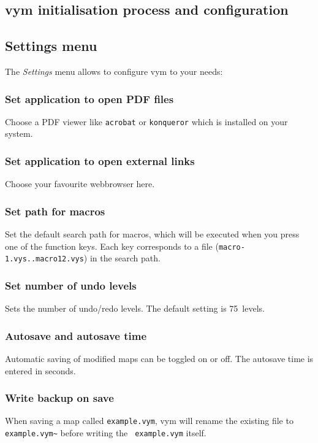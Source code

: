 \documentclass[12pt,a4paper]{article}
\newcommand{\vym}{{\sc vym }}
\begin{document}
\begin{appendix}

\section{\vym initialisation process and configuration}
\subsection {Settings menu} \label{settings}
    The {\em Settings} menu allows to configure \vym to your needs:

\subsubsection*{Set application to open PDF files} Choose a PDF
    viewer like {\tt acrobat} or {\tt konqueror} which is installed on
    your system.

\subsubsection*{Set application to open external links}
    Choose your favourite webbrowser here.

\subsubsection*{Set path for macros}
    Set the default search path for macros, which will be executed when
    you press one of the function keys. Each key corresponds to a file
    ({\tt macro-1.vys..macro12.vys}) in the search path.

\subsubsection*{Set number of undo levels}
    Sets the number of undo/redo levels. The default setting is
    75~levels.

\subsubsection*{Autosave and autosave time}
    Automatic saving of modified maps can be toggled on or off. The
    autosave time is entered in seconds.

\subsubsection*{Write backup on save}
    When saving a map called {\tt example.vym}, \vym will rename the
    existing file to {\tt example.vym\~{}} before writing the {\tt
    example.vym} itself.


\end{appendix}
\end{document}
